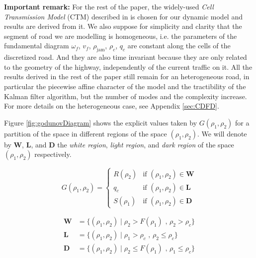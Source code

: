 \hspace{10mm}

\noindent\textbf{Important remark:} For the rest of the paper, the widely-used \textit{Cell Transmission Model} (CTM) described in \cite{Daganzo1994} is chosen for our dynamic model and results are derived from it. We also suppose for simplicity and clarity that the segment of road we are modelling is homogeneous, i.e. the parameters of the fundamental diagram $\omega_{f}$, $v_{f}$, $\rho_{\text{jam}}$, $\rho_{c}$, $q_{c}$ are constant along the cells of the discretized road. And they are also time invariant because they are only related to the geometry of the highway, independently of the current traffic on it. All the results derived in the rest of the paper still remain for an heterogeneous road, in particular the piecewise affine character of the model and the tractibility of the Kalman filter algorithm, but the number of modes and the complexity increase. For more details on the heterogeneous case, see Appendix \ref{sec:CDFD}.

\hspace{10mm}

\noindent Figure \ref{fig:godunovDiagram} shows the explicit values taken by $G(\rho_{1},\rho_{2})$ for a partition of the space in different regions of the space $(\rho_{1},\rho_{2})$. We will denote by \textbf{W}, \textbf{L}, and \textbf{D} the \textit{white region}, \textit{light region}, and \textit{dark region} of the space $(\rho_{1},\rho_{2})$ respectively. 

\begin{equation}
G(\rho_{1},\rho_{2}) = \begin{cases}
R(\rho_{2}) & \text{if } (\rho_{1},\rho_{2}) \in \textbf{W}\\
q_{c} & \text{if } (\rho_{1},\rho_{2}) \in \textbf{L}\\
S(\rho_{1}) & \text{if } (\rho_{1},\rho_{2}) \in \textbf{D}
\end{cases}
\label{eq:rhoGodunovFlux}
\end{equation}

\begin{equation}
\begin{array}{ll}
\textbf{W} & = \{(\rho_{1},\rho_{2}) \mid \rho_{2} > F(\rho_{1}) \text{ ,   } \rho_{2} > \rho_{c}\}\\
\textbf{L} & = \{(\rho_{1},\rho_{2}) \mid \rho_{1} > \rho_{c} \text{ ,   } \rho_{2} \leq \rho_{c}\}\\
\textbf{D} & = \{(\rho_{1},\rho_{2}) \mid \rho_{2} \leq F(\rho_{1}) \text{ ,   } \rho_{1} \leq \rho_{c}\}
\end{array}
\label{eq:regions}
\end{equation}

